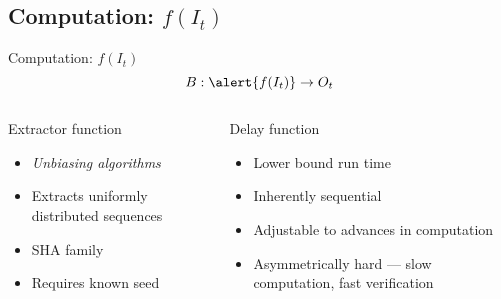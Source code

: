 \subsection{Computation: $f(I_t)$}

\begin{frame}{Computation: $f(I_t)$}
    \begin{equation*}
        B: \alert{f(I_t)} \rightarrow O_t
    \end{equation*}
    \begin{columns}[t]
        \begin{column}{0.5\textwidth}
            Extractor function
            \begin{itemize}
                \item \textit{Unbiasing algorithms}
                \item Extracts uniformly distributed sequences
                \item SHA family
                \item Requires known seed
            \end{itemize}
        \end{column}
        \begin{column}{0.5\textwidth}
            Delay function
            \begin{itemize}
                \item Lower bound run time
                \item Inherently sequential
                \item Adjustable to advances in computation
                \item Asymmetrically hard --- slow computation, fast verification
            \end{itemize}
        \end{column}
    \end{columns}
\end{frame}

